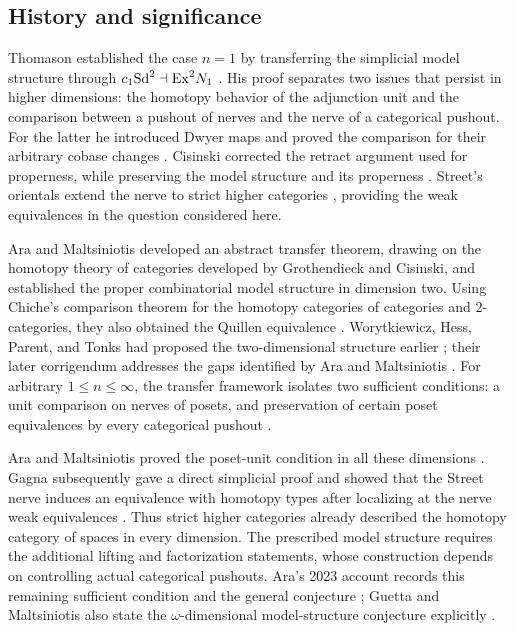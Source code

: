 \subsection*{History and significance}
Thomason established the case $n=1$ by transferring the simplicial
model structure through $c_1\mathrm{Sd}^2\dashv\mathrm{Ex}^2N_1$
\cite{Thomason1980}. His proof separates two issues that persist in
higher dimensions: the homotopy behavior of the adjunction unit and
the comparison between a pushout of nerves and the nerve of a
categorical pushout. For the latter he introduced Dwyer maps and proved
the comparison for their arbitrary cobase changes
\cite[Definition~4.1 and Proposition~4.3]{Thomason1980}.
Cisinski corrected the retract argument used for properness, while
preserving the model structure and its properness
\cite{Cisinski1999}.
Street's orientals extend the nerve to strict higher categories
\cite{Street1987}, providing the weak equivalences in the question
considered here.

Ara and Maltsiniotis developed an abstract transfer theorem, drawing
on the homotopy theory of categories developed by Grothendieck and
Cisinski, and established the proper combinatorial model structure
in dimension two. Using Chiche's comparison theorem for the
homotopy categories of categories and $2$-categories, they also
obtained the Quillen equivalence
\cite[Theorems~4.11, 6.27, 6.30, and Corollary~6.32]{AraMaltsiniotis2014}.
Worytkiewicz, Hess, Parent, and Tonks had proposed the two-dimensional
structure earlier \cite{WorytkiewiczHessParentTonks2007}; their later
corrigendum addresses the gaps identified by Ara and Maltsiniotis
\cite{WorytkiewiczHessParentTonks2016}.
For arbitrary $1\le n\le\infty$, the transfer framework isolates two
sufficient conditions: a unit comparison on nerves of posets, and
preservation of certain poset equivalences by every categorical
pushout \cite[Scholie~5.14]{AraMaltsiniotis2014}.

Ara and Maltsiniotis proved the poset-unit condition in all these
dimensions \cite[Corollary~10.11 and Scholie~10.12]{AraMaltsiniotis2015}.
Gagna subsequently gave a direct simplicial proof and showed that
the Street nerve induces an equivalence with homotopy types after
localizing at the nerve weak equivalences
\cite[Theorems~5.6 and~6.9]{Gagna2018}.
Thus strict higher categories already described the homotopy category
of spaces in every dimension. The prescribed model structure requires
the additional lifting and factorization statements, whose construction
depends on controlling actual categorical pushouts. Ara's 2023 account
records this remaining sufficient condition and the general conjecture
\cite[\S\S9.2.5--9.2.6]{Ara2023}; Guetta and Maltsiniotis also state
the $\omega$-dimensional model-structure conjecture explicitly
\cite[Introduction, p.~6]{GuettaMaltsiniotis2024}.


